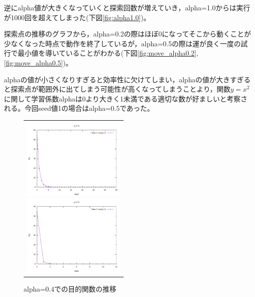 逆にalpha値が大きくなっていくと探索回数が増えていき，alpha=1.0からは実行が1000回を超えてしまった(下図\ref{fig:alpha1.0})。

探索点の推移のグラフから，alpha=0.2の際はほぼ0になってそこから動くことが少なくなった時点で動作を終了しているが，alpha=0.5の際は運が良く一度の試行で最小値を導いていることがわかる(下図\ref{fig:move_alpha0.2},\ref{fig:move_alpha0.5})。

alphaの値が小さくなりすぎると効率性に欠けてしまい，alphaの値が大きすぎると探索点が範囲外に出てしまう可能性が高くなってしまうことより，関数$y=x^2$に関して学習係数alphaは0より大きく1未満である適切な数が好ましいと考察される。今回seed値1の場合はalpha=0.5であった。

\begin{figure}[h]
 \begin{center}
  \begin{tabular}{c}
    \begin{minipage}{0.33\hsize}
    \begin{center}
    \includegraphics[width=5.0cm]{figs/alpha02.pdf}
    \caption{alpha=0.2での目的関数の推移}
    \label{fig:alpha0.2}
    \end{center}
    \end{minipage}
    
    \begin{minipage}{0.33\hsize}
    \begin{center}
    \includegraphics[width=5.0cm]{figs/alpha04.pdf}
    \caption{alpha=0.4での目的関数の推移}
    \label{fig:alpha0.4}
    \end{center}
    \end{minipage}
    

\end{tabular}
\end{center}
\end{figure}
